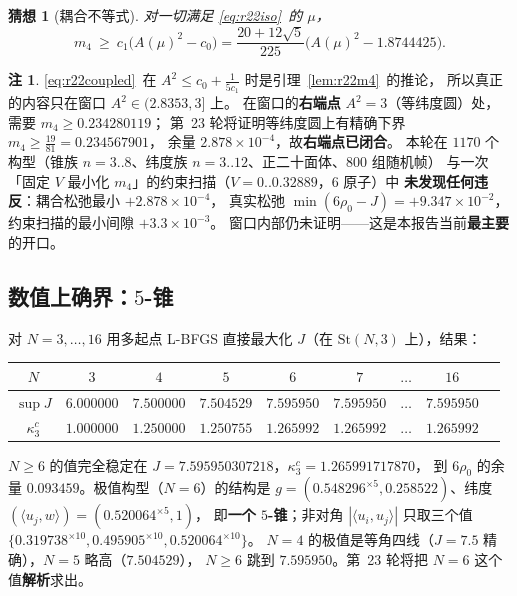 \documentclass[UTF8,11pt]{ctexart}
\newtheorem{conjecture}[theorem]{猜想}
\theoremstyle{definition}
\newtheorem{remark}[theorem]{注}
\begin{document}
\begin{conjecture}[耦合不等式]\label{conj:r22coupled}
对一切满足 \eqref{eq:r22iso}~的 $\mu$，
\begin{equation}\label{eq:r22coupled}
m_4\ \ge\ c_1\bigl(A(\mu)^2-c_0\bigr)
=\frac{20+12\sqrt5}{225}\bigl(A(\mu)^2-1.8744425\bigr).
\end{equation}
\end{conjecture}

\begin{remark}
\eqref{eq:r22coupled}~在 $A^2\le c_0+\frac1{5c_1}$ 时是引理~\ref{lem:r22m4}~的推论，
所以真正的内容只在窗口 $A^2\in(2.8353,3]$ 上。
在窗口的\textbf{右端点} $A^2=3$（等纬度圆）处，需要 $m_4\ge0.234280119$；
第~23 轮将证明等纬度圆上有精确下界 $m_4\ge\frac{19}{81}=0.234567901$，
余量 $2.878\times10^{-4}$，故\textbf{右端点已闭合}。
本轮在 $1170$ 个构型（锥族 $n=3..8$、纬度族 $n=3..12$、正二十面体、$800$ 组随机帧）
与一次「固定 $V$ 最小化 $m_4$」的约束扫描（$V=0..0.32889$，$6$ 原子）中
\textbf{未发现任何违反}：耦合松弛最小 $+2.878\times10^{-4}$，
真实松弛 $\min(6\rho_0-J)=+9.347\times10^{-2}$，约束扫描的最小间隙 $+3.3\times10^{-3}$。
窗口内部仍未证明——这是本报告当前\textbf{最主要}的开口。
\end{remark}

\subsection{数值上确界：$5$-锥}\label{sec:r22:num}

对 $N=3,\dots,16$ 用多起点 L-BFGS 直接最大化 $J$（在 $\mathrm{St}(N,3)$ 上），结果：
\begin{center}\small
\begin{tabular}{c|cccccccc}
\toprule
$N$ & $3$ & $4$ & $5$ & $6$ & $7$ & $\dots$ & $16$\\
\midrule
$\sup J$ & $6.000000$ & $7.500000$ & $7.504529$ & $\mathbf{7.595950}$ & $7.595950$ & $\dots$ & $7.595950$\\
$\kappa_3^c$ & $1.000000$ & $1.250000$ & $1.250755$ & $\mathbf{1.265992}$ & $1.265992$ & $\dots$ & $1.265992$\\
\bottomrule
\end{tabular}
\end{center}
$N\ge6$ 的值完全稳定在 $J=7.595950307218$，$\kappa_3^c=1.265991717870$，
到 $6\rho_0$ 的余量 $0.093459$。极值构型（$N=6$）的结构是
$g=(0.548296^{\times5},0.258522)$、纬度 $(\langle u_j,w\rangle)=(0.520064^{\times5},1)$，
即\textbf{一个 $5$-锥}；非对角 $|\langle u_i,u_j\rangle|$ 只取三个值
$\{0.319738^{\times10},0.495905^{\times10},0.520064^{\times10}\}$。
$N=4$ 的极值是等角四线（$J=7.5$ 精确），$N=5$ 略高（$7.504529$），
$N\ge6$ 跳到 $7.595950$。第~23 轮将把 $N=6$ 这个值\textbf{解析}求出。
\end{document}
